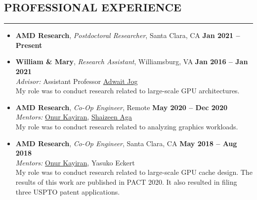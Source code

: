 \documentclass[10pt,a4]{article}
\begin{document}
\subsection*{PROFESSIONAL EXPERIENCE}
\hrule
\vspace{0.2cm}
\begin{itemize}

\item{\bf AMD Research}, {\it Postdoctoral Researcher}, Santa Clara, CA \hfill {\bf Jan 2021 -- Present}

\item{\bf William \& Mary}, {\it Research Assistant}, Williamsburg, VA \hfill {\bf Jan 2016 -- Jan 2021}\\
{\it Advisor:} Assistant Professor \href{http://www.cs.wm.edu/~adwait/}{Adwait Jog} \\
My role was to conduct research related to large-scale GPU architectures. 

\item{\bf AMD Research}, {\it Co-Op Engineer}, Remote \hfill {\bf May 2020 -- Dec 2020}\\
{\it Mentors:} \href{https://okayiran.github.io/}{Onur Kayiran}, \href{http://www.shaizeen.com/}{Shaizeen Aga} \\
My role was to conduct research related to analyzing graphics workloads. 

\item{\bf AMD Research}, {\it Co-Op Engineer}, Santa Clara, CA \hfill {\bf May 2018 -- Aug 2018}\\
{\it Mentors:} \href{https://okayiran.github.io/}{Onur Kayiran}, Yasuko Eckert \\
My role was to conduct research related to large-scale GPU cache design. The results of this work are published in PACT 2020. It also resulted in filing three USPTO patent applications.


\end{itemize}
\end{document}

